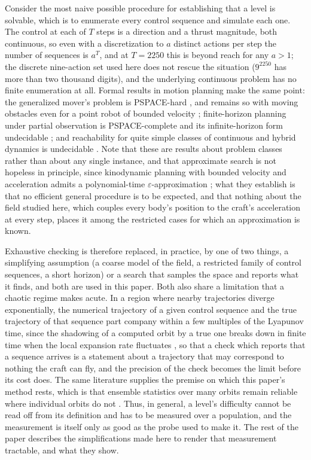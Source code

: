 \documentclass[11pt]{article}
\begin{document}
Consider the most naive possible procedure for establishing that a level is
solvable, which is to enumerate every control sequence and simulate each
one. The control at each of $T$ steps is a direction and a thrust magnitude,
both continuous, so even with a discretization to $a$ distinct actions per
step the number of sequences is $a^T$, and at $T = 2250$ this is beyond
reach for any $a > 1$; the discrete nine-action set used here does not
rescue the situation ($9^{2250}$ has more than two thousand digits), and the
underlying continuous problem has no finite enumeration at all. Formal
results in motion planning make the same point: the generalized mover's
problem is PSPACE-hard \cite{reif1979,hopcroft1984,canny1988}, and remains
so with moving obstacles even for a point robot of bounded velocity
\cite{reif1994}; finite-horizon planning under partial observation is
PSPACE-complete and its infinite-horizon form undecidable
\cite{papadimitriou1987,madani2003}; and reachability for quite simple
classes of continuous and hybrid dynamics is undecidable
\cite{moore1990,henzinger1998,blondel2000}. Note that these are results
about problem classes rather than about any single instance, and that
approximate search is not hopeless in principle, since kinodynamic planning
with bounded velocity and acceleration admits a polynomial-time
$\varepsilon$-approximation \cite{donald1993}; what they establish is that
no efficient general procedure is to be expected, and that nothing about
the field studied here, which couples every body's position to the craft's
acceleration at every step, places it among the restricted cases for which
an approximation is known.

Exhaustive checking is therefore replaced, in practice, by one of two
things, a simplifying assumption (a coarse model of the field, a restricted
family of control sequences, a short horizon) or a search that samples the
space and reports what it finds, and both are used in this paper. Both also
share a limitation that a chaotic regime makes acute. In a region where
nearby trajectories diverge exponentially, the numerical trajectory of a
given control sequence and the true trajectory of that sequence part company
within a few multiples of the Lyapunov time, since the shadowing of a
computed orbit by a true one breaks down in finite time when the local
expansion rate fluctuates \cite{hammel1987,sauer1997,sauer2002}, so that a
check which reports that a sequence arrives is a statement about a
trajectory that may correspond to nothing the craft can fly, and the precision of the check
becomes the limit before its cost does. The same literature supplies the
premise on which this paper's method rests, which is that ensemble
statistics over many orbits remain reliable where individual orbits do not
\cite{boekholt2015,portegieszwart2018}. Thus, in general, a level's
difficulty cannot be read off from its definition and has to be measured
over a population, and the measurement is itself only as good as the probe
used to make it. The rest of the paper describes the simplifications made
here to render that measurement tractable, and what they show.
\end{document}
